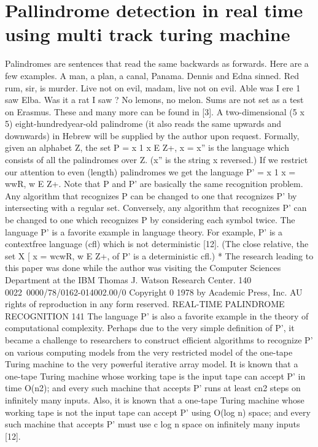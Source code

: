 \documentclass[11pt,a4paper]{report}
\begin{document}
\chapter{Pallindrome detection in real time using multi track turing machine}
Palindromes are sentences that read the same backwards as forwards. Here are a few
examples.
A man, a plan, a canal, Panama.
Dennis and Edna sinned.
Red rum, sir, is murder.
Live not on evil, madam, live not on evil.
Able was I ere 1 saw Elba.
Was it a rat I saw ?
No lemons, no melon.
Sums are not set as a test on Erasmus.
These and many more can be found in [3]. A two-dimensional (5 x 5) eight-hundredyear-old palindrome (it also reads the same upwards and downwards) in Hebrew will
be supplied by the author upon request.
Formally, given an alphabet Z, the set P = {x 1 x E Z+, x = x”} is the language
which consists of all the palindromes over Z. (x” is the string x reversed.) If we restrict
our attention to even (length) palindromes we get the language P’ = {x 1 x = wwR,
w E Z+}. Note that P and P’ are basically the same recognition problem. Any algorithm
that recognizes P can be changed to one that recognizes P’ by intersecting with a regular
set. Conversely, any algorithm that recognizes P’ can be changed to one which recognizes
P by considering each symbol twice.
The language P’ is a favorite example in language theory. For example, P’ is a contextfree language (cfl) which is not deterministic [12]. (The close relative, the set {X [ x =
wcwR, w E Z+}, of P’ is a deterministic cfl.)
* The research leading to this paper was done while the author was visiting the Computer
Sciences Department at the IBM Thomas J. Watson Research Center.
140
0022~0000/78/0162-014002.00/0
Copyright 0 1978 by Academic Press, Inc.
AU rights of reproduction in any form reserved. 
REAL-TIME PALINDROME RECOGNITION 141
The language P’ is also a favorite example in the theory of computational complexity.
Perhaps due to the very simple definition of P’, it became a challenge to researchers to
construct efficient algorithms to recognize P’ on various computing models from the very
restricted model of the one-tape Turing machine to the very powerful iterative array
model. It is known that a one-tape Turing machine whose working tape is the input tape
can accept P’ in time O(n2); and every such machine that accepts P’ runs at least cn2
steps on infinitely many inputs. Also, it is known that a one-tape Turing machine whose
working tape is not the input tape can accept P’ using O(log n) space; and every such
machine that accepts P’ must use c log n space on infinitely many inputs [12].
\end{document}
